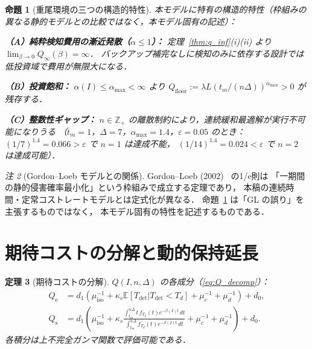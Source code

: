 \documentclass[12pt,a4paper]{article}
\theoremstyle{plain}
\newtheorem{theorem}{定理}[section]
\newtheorem{proposition}[theorem]{命題}
\theoremstyle{definition}
\theoremstyle{remark}
\newtheorem{remark}[theorem]{注}
\newcommand{\E}{\mathbb{E}}
\newcommand{\Z}{\mathbb{Z}}
\newcommand{\Qe}{Q_{\mathrm{e}}}
\newcommand{\Qs}{Q_{\mathrm{s}}}
\newcommand{\Qinf}{Q_{\infty}}
\newcommand{\Tdet}{T_{\mathrm{det}}}
\newcommand{\betaI}{\beta(I)}
\newcommand{\alphI}{\alpha(I)}
\begin{document}
\begin{proposition}[重尾環境の三つの構造的特性]\label{prop:structural_diff}
本モデルに特有の構造的特性（枠組みの異なる静的モデルとの比較ではなく，本モデル固有の記述）：

\noindent\textbf{（A）純粋検知費用の漸近発散（$\alpha\le1$）：}
定理~\ref{thm:q_inf}(i)(ii) より $\lim_{\beta\to0}\Qinf(\beta)=\infty$．
バックアップ補完なしに検知のみに依存する設計では低投資域で費用が無限大になる．

\noindent\textbf{（B）投資飽和：}
$\alphI\le\alpha_{\max}<\infty$ より $Q_{\mathrm{floor}}:=\lambda L(t_m/(n\Delta))^{\alpha_{\max}}>0$ が残存する．

\noindent\textbf{（C）整数性ギャップ：}
$n\in\Z_+$ の離散制約により，連続緩和最適解が実行不可能になりうる
（$t_m=1$，$\Delta=7$，$\alpha_{\max}=1.4$，$\varepsilon=0.05$ のとき：
$(1/7)^{1.4}=0.066>\varepsilon$ で $n=1$ は達成不能，
$(1/14)^{1.4}=0.024<\varepsilon$ で $n=2$ は達成可能）．
\end{proposition}

\begin{remark}[Gordon--Loeb モデルとの関係]\label{rem:gl}
Gordon--Loeb (2002)~\cite{gordon2002} の1/e則は
「一期間の静的侵害確率最小化」という枠組みで成立する定理であり，
本稿の連続時間・定常コストレートモデルとは定式化が異なる．
命題~\ref{prop:structural_diff} は「GL の誤り」を主張するものではなく，
本モデル固有の特性を記述するものである．
\end{remark}

\section{期待コストの分解と動的保持延長}
\label{sec:cost_detail}

\begin{theorem}[期待コストの分解]\label{thm:cost_decomp}
$Q(I,n,\Delta)$ の各成分（\eqref{eq:Q_decomp}）：
\begin{align}
\Qe&=d_1\!\left(\mu_{\mathrm{iso}}^{-1}+\kappa_s\E[\Tdet|\Tdet<T_d]
+\mu_c^{-1}+\mu_d^{-1}\right)+d_0,\label{eq:Qe}\\
\Qs&=d_1\!\left(\mu_{\mathrm{iso}}^{-1}+\kappa_s\frac{\int_{t_m}^{n\Delta}t\,f_{T_d}(t)e^{-\betaI t}\,dt}
{\int_{t_m}^{n\Delta}f_{T_d}(t)e^{-\betaI t}\,dt}+\mu_c^{-1}+\mu_d^{-1}\right)+d_0.\label{eq:Qs}
\end{align}
各積分は上不完全ガンマ関数で評価可能である．
\end{theorem}
\end{document}
